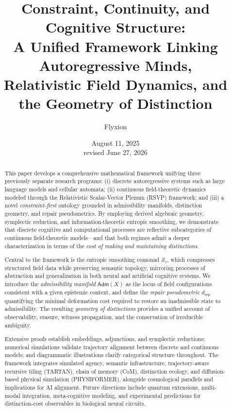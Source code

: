 \documentclass[a4paper,12pt]{article}
\title{Constraint, Continuity, and Cognitive Structure:\\
A Unified Framework Linking Autoregressive Minds,\\
Relativistic Field Dynamics, and the Geometry of Distinction}
\author{Flyxion}
\date{August 11, 2025\\
revised June 27, 2026}
\theoremstyle{definition}
\newcommand{\Stau}{\mathcal{S}_\tau}
\newcommand{\Adm}{\mathsf{Adm}}
\newcommand{\dRP}{d_{\mathrm{rep}}}
\begin{document}
\maketitle

\begin{abstract}
This paper develops a comprehensive mathematical framework unifying three previously separate research programs: (i) discrete autoregressive systems such as large language models and cellular automata; (ii) continuous field-theoretic dynamics modeled through the Relativistic Scalar-Vector Plenum (RSVP) framework; and (iii) a novel \emph{constraint-first} ontology grounded in admissibility manifolds, distinction geometry, and repair pseudometrics. By employing derived algebraic geometry, symplectic reduction, and information-theoretic entropic smoothing, we demonstrate that discrete cognitive and computational processes are reflective subcategories of continuous field-theoretic models—and that both regimes admit a deeper characterization in terms of the \emph{cost of making and maintaining distinctions}. 

Central to the framework is the entropic smoothing comonad \(\Stau\), which compresses structured field data while preserving semantic topology, mirroring processes of abstraction and generalization in both neural and artificial cognitive systems. We introduce the \emph{admissibility manifold} \(\Adm(X)\) as the locus of field configurations consistent with a given epistemic context, and define the \emph{repair pseudometric} \(\dRP\) quantifying the minimal deformation cost required to restore an inadmissible state to admissibility. The resulting \emph{geometry of distinctions} provides a unified account of observability, erasure, witness propagation, and the conservation of irreducible ambiguity.

Extensive proofs establish embeddings, adjunctions, and symplectic reductions; numerical simulations validate trajectory alignment between discrete and continuous models; and diagrammatic illustrations clarify categorical structure throughout. The framework integrates simulated agency, semantic infrastructure, trajectory-aware recursive tiling (TARTAN), chain of memory (CoM), distinction ecology, and diffusion-based physical simulation (PHYSIFORMER), alongside cosmological parallels and implications for AI alignment. Future directions include quantum extensions, multi-modal integration, meta-cognitive modeling, and experimental predictions for distinction-cost observables in biological neural circuits.
\end{abstract}
\end{document}
